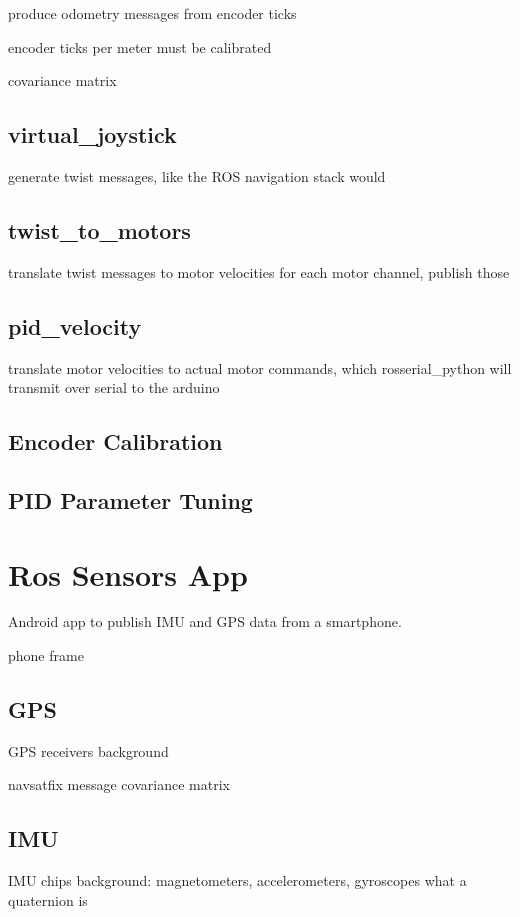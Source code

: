 produce odometry messages from encoder ticks

encoder ticks per meter must be calibrated

covariance matrix

\subsection{virtual\_joystick}
generate twist messages, like the ROS navigation stack would

\subsection{twist\_to\_motors}
translate twist messages to motor velocities for each motor channel, publish those


\subsection{pid\_velocity}
translate motor velocities to actual motor commands, which rosserial\_python will transmit over serial to the arduino

\subsection{Encoder Calibration}

\subsection{PID Parameter Tuning}

\section{Ros Sensors App}
Android app to publish IMU and GPS data from a smartphone.

phone frame

\subsection{GPS}
GPS receivers background

navsatfix message
covariance matrix

\subsection{IMU}
IMU chips background: magnetometers, accelerometers, gyroscopes
what a quaternion is

